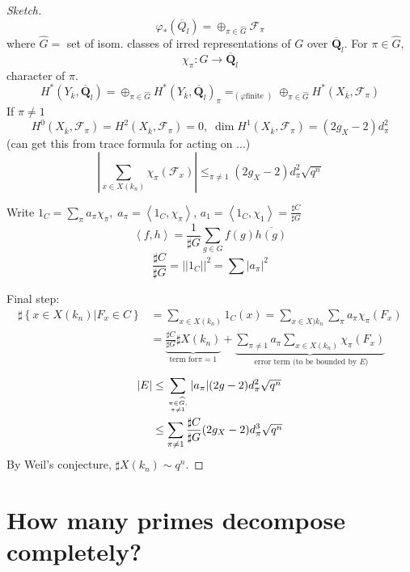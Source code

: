 \begin{proof}[Sketch]
$$\varphi_*(\overline Q_l) = \oplus_{\pi\in \widehat G}
\mathcal{F}_{\pi}$$
where $\widehat G = $ set of isom. classes of irred representations of
$G$ over $\overline{\mathbf{Q}}_l$. For $\pi\in \widehat G$,
$$\chi_{\pi}: G\to\overline{\mathbf{Q}}_l$$
character of $\pi$.
$$H^*(Y_{\overline k}, \overline{\mathbf{Q}}_l) = \oplus_{\pi\in
\widehat G} H^*(Y_{\overline k}, \overline{\mathbf{Q}}_l)_\pi =_{(\varphi\text{
finite })} \oplus_{\pi\in \widehat G}H^*(X_{\overline k}, \mathcal{F}_\pi)$$
If $\pi\neq 1$
$$H^0(X_{\overline k},\mathcal{F}_\pi) = H^2(X_{\overline k},
\mathcal{F}_\pi)=0, \; \dim H^1(X_{\overline k}, \mathcal{F}_\pi) =
(2g_X-2)d_\pi^2$$
(can get this from trace formula for acting on ...)
$$\left|\sum_{x\in X(k_n)}\chi_\pi(\mathcal{F}_x)\right|\leq_{\pi\neq
1} (2g_X-2)d_\pi^2\sqrt{q^n}$$

Write $1_C = \sum_\pi a_\pi\chi_\pi, \; a_\pi=\left<1_C,
\chi_\pi\right>$, $a_1 = \left<1_C, \chi_1\right> = \frac{\sharp C}{\sharp G}$
$$\left<f, h\right> = \frac{1}{\sharp G}\sum_{g\in
G}f(g)\overline{h(g)}$$
$$\frac{\sharp C}{\sharp G} = ||1_C||^2 = \sum|a_\pi|^2$$

\noindent
Final step:
\begin{align*}
\sharp\left\{x\in X(k_n)\left| F_x\in C\right.\right\}&=\sum_{x\in
X(k_n)}1_C(x) = \sum_{x\in X)k_n}\sum_{\pi}a_\pi\chi_\pi(F_x)\\
&=\underbrace{\frac{\sharp C}{\sharp G}\sharp X(k_n)}_{\text{term for
}\pi=1}+\underbrace{\sum_{\pi\neq 1}a_\pi\sum_{x\in
X(k_n)}\chi_\pi(F_x)}_{\text{ error term (to be bounded by $E$)}}
\end{align*}
\begin{align*}
|E|&\leq \sum_{\pi\in \widehat G, \atop \pi\neq
1}|a_\pi|(2g-2)d_\pi^2\sqrt{q^n}\\
&\leq \sum_{\pi\neq 1} \frac{\sharp C}{\sharp G}
(2g_X-2)d_\pi^3\sqrt{q^n}
\end{align*}
By Weil's conjecture, $\sharp X(k_n)\sim q^n$.
\end{proof}



\section{How many primes decompose completely?}
\label{section-how-many}

